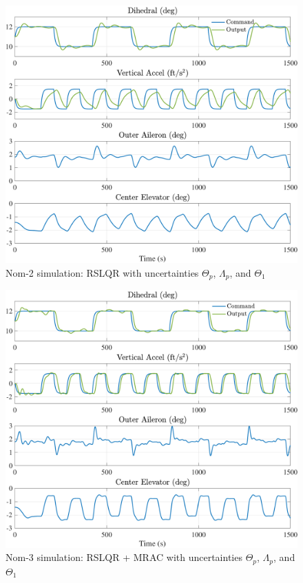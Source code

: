 \documentclass[english]{ifacconf}
\begin{document}
\begin{figure}[htbp]
	\centering
	\includegraphics[width=\columnwidth]{../fig/nom2.pdf}
	\caption{Nom-2 simulation: RSLQR with uncertainties $\Theta_p$, $\Lambda_p$, and $\Theta_1$}
	\label{fig:nom2}
\end{figure}

\begin{figure}[htbp]
	\centering
	\includegraphics[width=\columnwidth]{../fig/nom3.pdf}
	\caption{Nom-3 simulation: RSLQR + MRAC with uncertainties $\Theta_p$, $\Lambda_p$, and $\Theta_1$}
	\label{fig:nom3}
\end{figure}
\end{document}
